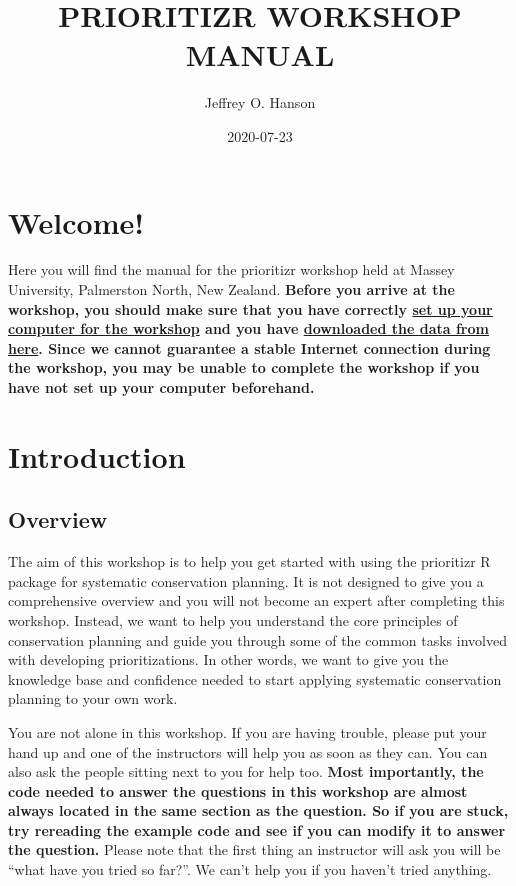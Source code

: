 \documentclass[12pt,]{book}
\title{PRIORITIZR WORKSHOP MANUAL}
\author{Jeffrey O. Hanson}
\date{2020-07-23}
\begin{document}
\maketitle

{
\hypersetup{linkcolor=black}
\setcounter{tocdepth}{0}
\tableofcontents
}
\chapter{Welcome!}\label{welcome}

Here you will find the manual for the prioritizr workshop held at Massey
University, Palmerston North, New Zealand. \textbf{Before you arrive at
the workshop, you should make sure that you have correctly
\protect\hyperlink{setup}{set up your computer for the workshop} and you
have
\href{https://github.com/prioritizr/massey-workshop/raw/master/data.zip}{downloaded
the data from here}. Since we cannot guarantee a stable Internet
connection during the workshop, you may be unable to complete the
workshop if you have not set up your computer beforehand.}

\chapter{Introduction}\label{introduction}

\section{Overview}\label{overview}

The aim of this workshop is to help you get started with using the
prioritizr R package for systematic conservation planning. It is not
designed to give you a comprehensive overview and you will not become an
expert after completing this workshop. Instead, we want to help you
understand the core principles of conservation planning and guide you
through some of the common tasks involved with developing
prioritizations. In other words, we want to give you the knowledge base
and confidence needed to start applying systematic conservation planning
to your own work.

You are not alone in this workshop. If you are having trouble, please
put your hand up and one of the instructors will help you as soon as
they can. You can also ask the people sitting next to you for help too.
\textbf{Most importantly, the code needed to answer the questions in
this workshop are almost always located in the same section as the
question. So if you are stuck, try rereading the example code and see if
you can modify it to answer the question.} Please note that the first
thing an instructor will ask you will be ``what have you tried so
far?''. We can't help you if you haven't tried anything.
\end{document}
